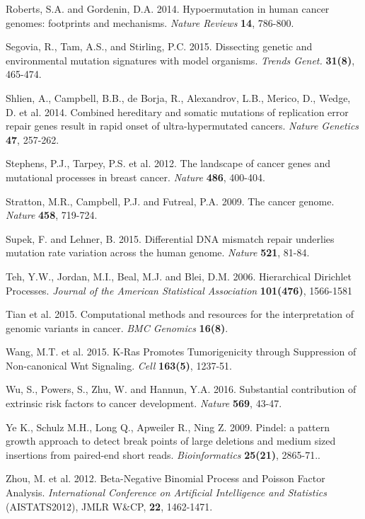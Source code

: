 \begin{thebibliography}{1}
 Roberts, S.A. and Gordenin, D.A. 2014. Hypoermutation in human cancer genomes: footprints and mechanisms. \textit{Nature Reviews} \textbf{14}, 786-800.

 Segovia, R., Tam, A.S., and Stirling, P.C. 2015. Dissecting genetic and environmental mutation signatures with model organisms. \textit{Trends Genet.} \textbf{31(8)}, 465-474.

 Shlien, A., Campbell, B.B., de Borja, R., Alexandrov, L.B., Merico, D., Wedge, D. et al. 2014. Combined hereditary and somatic mutations of replication error repair genes result in rapid onset of ultra-hypermutated cancers. \textit{Nature Genetics} \textbf{47}, 257-262.

 Stephens, P.J., Tarpey, P.S. et al. 2012. The landscape of cancer genes and mutational processes in breast cancer. \textit{Nature} \textbf{486}, 400-404.

 Stratton, M.R., Campbell, P.J. and Futreal, P.A. 2009. The cancer genome. \textit{Nature} \textbf{458}, 719-724.

 Supek, F. and Lehner, B. 2015. Differential DNA mismatch repair underlies mutation rate variation across the human genome. \textit{Nature} \textbf{521}, 81-84.

 Teh, Y.W., Jordan, M.I., Beal, M.J. and Blei, D.M. 2006. Hierarchical Dirichlet Processes. \textit{Journal of the American Statistical Association} \textbf{101(476)}, 1566-1581

 Tian et al. 2015. Computational methods and resources for the interpretation of genomic variants in cancer. \textit{BMC Genomics} \textbf{16(8)}.

 Wang, M.T. et al. 2015. K-Ras Promotes Tumorigenicity through Suppression of Non-canonical Wnt Signaling. \textit{Cell} \textbf{163(5)}, 1237-51.

 Wu, S., Powers, S., Zhu, W. and Hannun, Y.A. 2016. Substantial contribution of extrinsic risk factors to cancer development. \textit{Nature} \textbf{569}, 43-47.

 Ye K., Schulz M.H., Long Q., Apweiler R., Ning Z. 2009. Pindel: a pattern growth approach to detect break points of large deletions and medium sized insertions from paired-end short reads. \textit{Bioinformatics} \textbf{25(21)}, 2865-71..

 Zhou, M. et al. 2012. Beta-Negative Binomial Process and Poisson Factor Analysis. \textit{International Conference on Artificial Intelligence and Statistics} (AISTATS2012), JMLR W\&CP, \textbf{22}, 1462-1471.

\end{thebibliography}